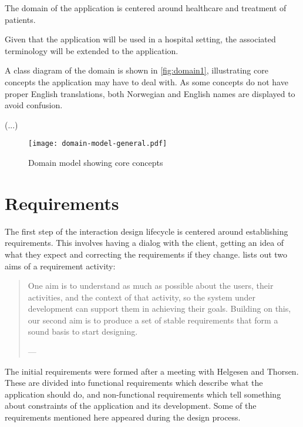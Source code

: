 The domain of the application is centered around healthcare and treatment of patients.


Given that the application will be used in a hospital setting, the associated terminology will be extended to the application.

A class diagram of the domain is shown in \autoref{fig:domain1}, illustrating core concepts the application may have to deal with. As some concepts do not have proper English translations, both Norwegian and English names are displayed to avoid confusion.

(...)


\begin{figure}
    \centering
    \texttt{[image: domain-model-general.pdf]}
    \caption{Domain model showing core concepts}
    \label{fig:domain1}
\end{figure}

\section{Requirements}
\label{sec:requirements}

The first step of the interaction design lifecycle is centered around establishing requirements. This involves having a dialog with the client, getting an idea of what they expect and correcting the requirements if they change. \textcite{preece2015} lists out two aims of a requirement activity:

\begin{quote}
    One aim is to understand as much as possible about the users, their activities, and the context of that activity, so the system under development can support them in achieving their goals. Building on this, our second aim is to produce a set of stable requirements that form a sound basis to start designing.

    \raggedleft--- \textcite{preece2015}
\end{quote}

The initial requirements were formed after a meeting with Helgesen and Thorsen. These are divided into functional requirements which describe what the application should do, and non-functional requirements which tell something about constraints of the application and its development. Some of the requirements mentioned here appeared during the design process.


